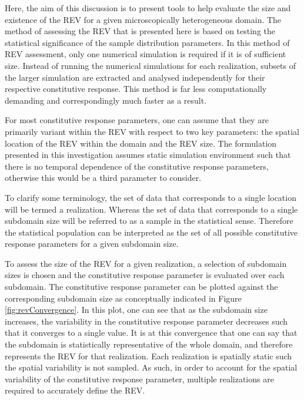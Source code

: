 Here, the aim of this discussion is to present tools to help evaluate the size and existence of the REV for a given microscopically heterogeneous domain. The method of assessing the REV that is presented here is based on testing the statistical significance of the sample distribution parameters. In this method of REV assessment, only one numerical simulation is required if it is of sufficient size. Instead of running the numerical simulations for each realization, subsets of the larger simulation are extracted and analysed independently for their respective constitutive response. This method is far less computationally demanding and correspondingly much faster as a result.  

For most constitutive response parameters, one can assume that they are primarily variant within the REV with respect to two key parameters: the spatial location of the REV within the domain and the REV size. The formulation presented in this investigation assumes static simulation environment such that there is no temporal dependence of the constitutive response parameters, otherwise this would be a third parameter to consider. 

To clarify some terminology, the set of data that corresponds to a single location will be termed a realization. Whereas the set of data that corresponds to a single subdomain size will be referred to as a sample in the statistical sense. Therefore the statistical population can be interpreted as the set of all possible constitutive response parameters for a given subdomain size. 

To assess the size of the REV for a given realization, a selection of subdomain sizes is chosen and the constitutive response parameter is evaluated over each subdomain. The constitutive response parameter can be plotted against the corresponding subdomain size as conceptually indicated in Figure \ref{fig:revConvergence}. In this plot, one can see that as the subdomain size increases, the variability in the constitutive response parameter decreases such that it converges to a single value. It is at this convergence that one can say that the subdomain is statistically representative of the whole domain, and therefore represents the REV for that realization. Each realization is spatially static such the spatial variability is not sampled. As such, in order to account for the spatial variability of the constitutive response parameter, multiple realizations are required to accurately define the REV.

